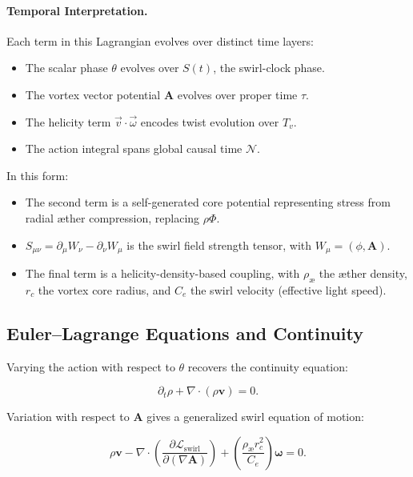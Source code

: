 \paragraph{Temporal Interpretation.}
Each term in this Lagrangian evolves over distinct time layers:
\begin{itemize}
  \item The scalar phase $\theta$ evolves over $S(t)$, the swirl-clock phase.
  \item The vortex vector potential $\mathbf{A}$ evolves over proper time $\tau$.
  \item The helicity term $\vec{v} \cdot \vec{\omega}$ encodes twist evolution over $T_v$.
  \item The action integral spans global causal time $\mathcal{N}$.
\end{itemize}

In this form:
\begin{itemize}
    \item The second term is a self-generated core potential representing stress from radial \ae{}ther compression, replacing $\rho \Phi$.
    \item $S_{\mu\nu} = \partial_\mu W_\nu - \partial_\nu W_\mu$ is the swirl field strength tensor, with $W_\mu = (\phi, \mathbf{A})$.
    \item The final term is a helicity-density-based coupling, with $\rho_{\text{\ae}}$ the \ae{}ther density, $r_c$ the vortex core radius, and $C_e$ the swirl velocity (effective light speed).
\end{itemize}

\subsection{Euler--Lagrange Equations and Continuity}

Varying the action with respect to $\theta$ recovers the continuity equation:

\begin{equation}
\partial_t \rho + \nabla \cdot (\rho \mathbf{v}) = 0.
\end{equation}

Variation with respect to $\mathbf{A}$ gives a generalized swirl equation of motion:

\begin{equation}
\rho \mathbf{v} - \nabla \cdot \left( \frac{\partial \mathcal{L}_{\text{swirl}}}{\partial (\nabla \mathbf{A})} \right) + \left( \frac{\rho_{\text{\ae}} r_c^2}{C_e} \right) \boldsymbol{\omega} = 0.
\end{equation}

